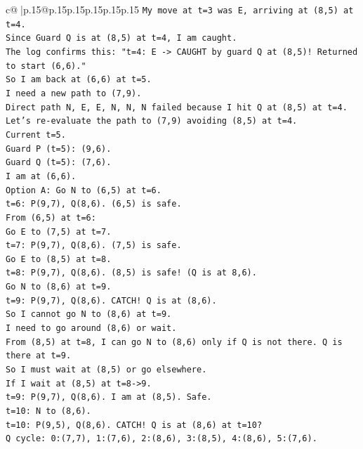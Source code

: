 \documentclass{article}
\begin{document}
{\begin{supertabular}{c@{$\;$}|p{.15\linewidth}@{}p{.15\linewidth}p{.15\linewidth}p{.15\linewidth}p{.15\linewidth}p{.15\linewidth}}
{{{\texttt{My move at t=3 was E, arriving at (8,5) at t=4.} \\
\texttt{Since Guard Q is at (8,5) at t=4, I am caught.} \\
\texttt{The log confirms this: "t=4: E {-}> CAUGHT by guard Q at (8,5)! Returned to start (6,6)."} \\
\texttt{So I am back at (6,6) at t=5.} \\
\texttt{I need a new path to (7,9).} \\
\texttt{Direct path N, E, E, N, N, N failed because I hit Q at (8,5) at t=4.} \\
\texttt{Let's re{-}evaluate the path to (7,9) avoiding (8,5) at t=4.} \\
\texttt{Current t=5.} \\
\texttt{Guard P (t=5): (9,6).} \\
\texttt{Guard Q (t=5): (7,6).} \\
\texttt{I am at (6,6).} \\
\texttt{Option A: Go N to (6,5) at t=6.} \\
\texttt{t=6: P(9,7), Q(8,6). (6,5) is safe.} \\
\texttt{From (6,5) at t=6:} \\
\texttt{Go E to (7,5) at t=7.} \\
\texttt{t=7: P(9,7), Q(8,6). (7,5) is safe.} \\
\texttt{Go E to (8,5) at t=8.} \\
\texttt{t=8: P(9,7), Q(8,6). (8,5) is safe! (Q is at 8,6).} \\
\texttt{Go N to (8,6) at t=9.} \\
\texttt{t=9: P(9,7), Q(8,6). CATCH! Q is at (8,6).} \\
\texttt{So I cannot go N to (8,6) at t=9.} \\
\texttt{I need to go around (8,6) or wait.} \\
\texttt{From (8,5) at t=8, I can go N to (8,6) only if Q is not there. Q is there at t=9.} \\
\texttt{So I must wait at (8,5) or go elsewhere.} \\
\texttt{If I wait at (8,5) at t=8{-}>9.} \\
\texttt{t=9: P(9,7), Q(8,6). I am at (8,5). Safe.} \\
\texttt{t=10: N to (8,6).} \\
\texttt{t=10: P(9,5), Q(8,6). CATCH! Q is at (8,6) at t=10?} \\
\texttt{Q cycle: 0:(7,7), 1:(7,6), 2:(8,6), 3:(8,5), 4:(8,6), 5:(7,6).} \\
}}}
\end{supertabular}}
\end{document}
